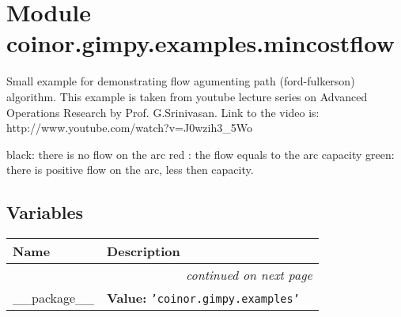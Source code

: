 %
%
%


\section{Module coinor.gimpy.examples.mincostflow}

    \label{coinor:gimpy:examples:mincostflow}
Small example for demonstrating flow agumenting path (ford-fulkerson) 
algorithm. This example is taken from youtube lecture series on Advanced 
Operations Research by Prof. G.Srinivasan. Link to the video is: 
http://www.youtube.com/watch?v=J0wzih3\_5Wo

black: there is no flow on the arc red  : the flow equals to the arc 
capacity green: there is positive flow on the arc, less then capacity.



  \subsection{Variables}

    \vspace{-1cm}
\hspace{\varindent}\begin{longtable}{|p{\varnamewidth}|p{\vardescrwidth}|l}
\cline{1-2}
\cline{1-2} \centering \textbf{Name} & \centering \textbf{Description}& \\
\cline{1-2}
\endhead\cline{1-2}\multicolumn{3}{r}{\small\textit{continued on next page}}\\\endfoot\cline{1-2}
\endlastfoot\raggedright \_\-\_\-p\-a\-c\-k\-a\-g\-e\-\_\-\_\- & \raggedright \textbf{Value:} 
{\tt \texttt{'}\texttt{coinor.gimpy.examples}\texttt{'}}&\\
\cline{1-2}
\end{longtable}

